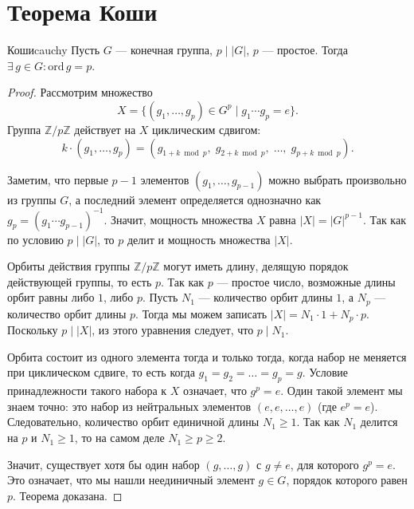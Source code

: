\section{Теорема Коши}

\begin{Theorem}{Коши}{cauchy}
	Пусть $G$ — конечная группа, $p \mid |G|$, $p$ — простое.
	Тогда $\exists\, g \in G\colon \mathrm{ord}\, g = p$.
\end{Theorem}

\begin{proof}
	Рассмотрим множество
	\[
	X = \{(g_1, \ldots, g_p) \in G^p \mid g_1 \cdots g_p = e\}.
	\] 
	Группа $\mathbb{Z}/p\mathbb{Z}$ действует на $X$ циклическим сдвигом:
	\[
	k \cdot (g_1, \ldots, g_p) = (g_{1+k \bmod p},\; g_{2+k \bmod p},\; \ldots,\; g_{p+k \bmod p}).
	\] 

	Заметим, что первые $p-1$ элементов $(g_1, \dots, g_{p-1})$ можно выбрать произвольно из группы $G$, а последний элемент определяется однозначно как $g_p = (g_1 \cdots g_{p-1})^{-1}$. Значит, мощность множества $X$ равна $|X| = |G|^{p-1}$. Так как по условию $p \mid |G|$, то $p$ делит и мощность множества $|X|$.

	Орбиты действия группы $\mathbb{Z}/p\mathbb{Z}$ могут иметь длину, делящую порядок действующей группы, то есть $p$. Так как $p$ — простое число, возможные длины орбит равны либо $1$, либо $p$.
	Пусть $N_1$ — количество орбит длины $1$, а $N_p$ — количество орбит длины $p$.
	Тогда мы можем записать $|X| = N_1 \cdot 1 + N_p \cdot p$.
	Поскольку $p \mid |X|$, из этого уравнения следует, что $p \mid N_1$.

	Орбита состоит из одного элемента тогда и только тогда, когда набор не меняется при циклическом сдвиге, то есть когда $g_1 = g_2 = \dots = g_p = g$. Условие принадлежности такого набора к $X$ означает, что $g^p = e$.
	Один такой элемент мы знаем точно: это набор из нейтральных элементов $(e, e, \dots, e)$ (где $e^p = e$). Следовательно, количество орбит единичной длины $N_1 \ge 1$.
	Так как $N_1$ делится на $p$ и $N_1 \ge 1$, то на самом деле $N_1 \ge p \ge 2$.

	Значит, существует хотя бы один набор $(g, \dots, g)$ с $g \neq e$, для которого $g^p = e$.
	Это означает, что мы нашли неединичный элемент $g \in G$, порядок которого равен $p$. Теорема доказана.
\end{proof}
